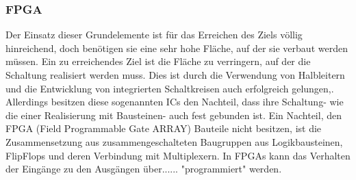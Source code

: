 \documentclass[conference]{IEEEtran}
\begin{document}
\subsubsection{FPGA}
Der Einsatz dieser Grundelemente ist für das Erreichen des Ziels völlig hinreichend, doch benötigen sie eine sehr hohe Fläche, auf der sie verbaut werden müssen. Ein zu erreichendes Ziel ist die Fläche zu verringern, auf der die Schaltung realisiert werden muss. Dies ist durch die Verwendung von Halbleitern und die Entwicklung von integrierten Schaltkreisen auch erfolgreich gelungen,. Allerdings besitzen diese sogenannten ICs den Nachteil, dass ihre Schaltung- wie die einer Realisierung mit Bausteinen- auch fest gebunden ist. Ein Nachteil, den FPGA (Field Programmable Gate ARRAY) Bauteile nicht besitzen, ist die Zusammensetzung aus zusammengeschalteten Baugruppen aus Logikbausteinen, FlipFlops und deren Verbindung mit Multiplexern. In FPGAs kann das Verhalten der Eingänge zu den Ausgängen über{\color{red}...... }"programmiert" werden.
\end{document}
